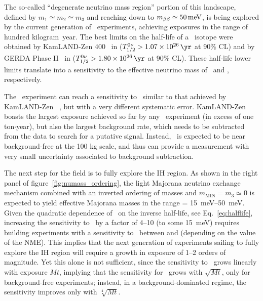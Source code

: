 The so-called ``degenerate neutrino mass region'' portion of this landscape, defined by $m_1\simeq m_2\simeq m_3$ and reaching down to $\mbb \simeq \SI{50}{\meV}$, is being explored by the current generation of \bbonu\ experiments, achieving exposures in the range of hundred kilogram~year. 
The best limits on the half-life of a \bbonu\ isotope were obtained by KamLAND-Zen 400~\cite{KamLAND-Zen:2016pfg} in  ($\Tonu > \KZenTz$ at 90\% CL) and by GERDA Phase II~\cite{GERDA:2020xhi} in  ($\Tonu > \GerdaTz$ at 90\% CL). These half-life lower limits translate into a sensitivity to the effective neutrino mass of \KZenMbb\ and \GerdaMbb, respectively. 


The \Next\ experiment can reach a sensitivity to \Tonu\ similar to that achieved by  KamLAND-Zen ~\cite{Martin-Albo:2015rhw}, but with a very different systematic error. KamLAND-Zen boasts the largest exposure achieved so far by any \bbonu\ experiment (in excess of one ton$\cdot$year), but also the largest background rate, which needs to be subtracted from the data to search for a putative signal. Instead, \Next\ is expected to be near background-free at the 100 kg scale, and thus can provide a measurement with very small uncertainty associated to background subtraction. 
 
 
The next step for the field is to fully explore the IH region. As shown in the right panel of figure~\ref{fig:numass_ordering}, the light Majorana neutrino exchange mechanism combined with an inverted ordering of masses and $m_\mathrm{MIN}=m_3\simeq 0$ is expected to yield effective Majorana masses in the range \mbb = \SIrange{15}{50}{\meV}. Given the quadratic dependence of \mbb\ on the inverse half-life, see Eq.~\ref{eq:halflife}, increasing the sensitivity to \mbb\ by a factor of 4--10 (to some \SI{15}{\meV}) requires building experiments with a sensitivity to \Tonu\ between \IHTzl \; and  \IHTz \;  (depending on the value of the NME). This implies that the next generation of experiments sailing to fully explore the IH region will require a growth in exposure of 1--2 orders of magnitude.  Yet this alone is not sufficient, since the sensitivity to \Tonu\ grows linearly with exposure $Mt$, implying that the sensitivity for \mbb\ grows with $\sqrt{Mt}$, only for background-free experiments; instead, in a background-dominated regime, the sensitivity improves only with $\sqrt[4]{Mt}$.

